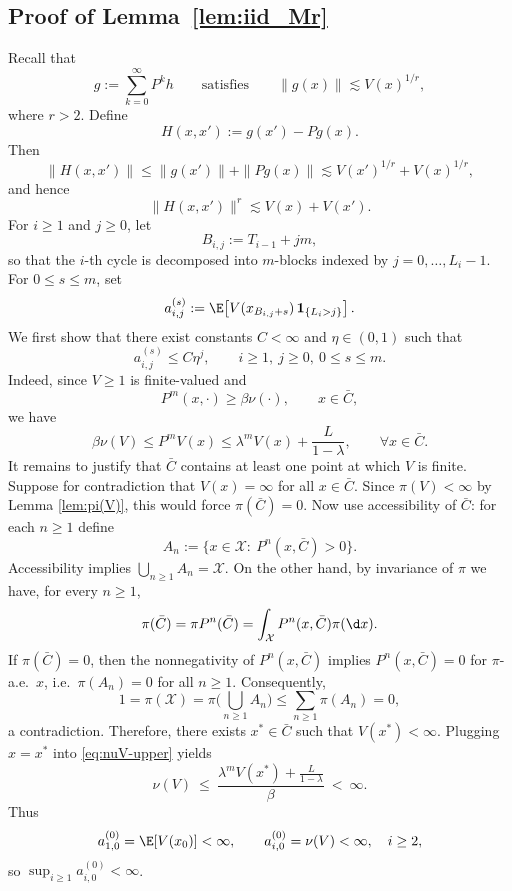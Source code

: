 \documentclass[mnsc,nonblindrev]{informs3}
\begin{document}
\subsection{Proof of Lemma~\ref{lem:iid_Mr}}\label{sec:iid_Mr}
Recall that 
\[
g:=\sum_{k=0}^\infty P^k h
\qquad\text{satisfies}\qquad
\|g(x)\|\lesssim V(x)^{1/r},
\]
where \(r>2\). Define
\[
H(x,x'):=g(x')-Pg(x).
\]
Then
\begin{equation}\label{eq:H-bound}
\|H(x,x')\|
\le \|g(x')\|+\|Pg(x)\|
\lesssim V(x')^{1/r}+V(x)^{1/r},
\end{equation}
and hence
\begin{equation}\label{eq:H-r-bound}
\|H(x,x')\|^r \lesssim V(x)+V(x').
\end{equation}
For \(i\ge1\) and \(j\ge0\), let
\[
B_{i,j}:=T_{i-1}+jm,
\]
so that the \(i\)-th cycle is decomposed into \(m\)-blocks indexed by
\(j=0,\dots,L_i-1\). For \(0\le s\le m\), set
\[
a_{i,j}^{(s)}
:=
\E\!\left[V(x_{B_{i,j}+s})\,\mathbf 1_{\{L_i>j\}}\right].
\]
We first show that there exist constants \(C<\infty\) and \(\eta\in(0,1)\) such
that
\begin{equation}\label{eq:cycle-V-bound}
a_{i,j}^{(s)}\le C\eta^j,
\qquad
i\ge1,\ j\ge0,\ 0\le s\le m.
\end{equation}
Indeed, since \(V\ge1\) is finite-valued and
\[
P^m(x,\cdot)\ge \beta \nu(\cdot),\qquad x\in \bar C,
\]
we have
\begin{equation}\label{eq:nuV-upper}
\beta \nu(V)\le P^mV(x)\le \lambda^mV(x)+\frac{L}{1-\lambda},
\qquad \forall x\in \bar C.
\end{equation}
It remains to justify that $\bar C$ contains at least one point at which $V$ is finite.
Suppose for contradiction that $V(x)=\infty$ for all $x\in\bar C$.
Since $\pi(V)<\infty$ by Lemma \ref{lem:pi(V)}, this would force $\pi(\bar C)=0$.
Now use accessibility of $\bar C$: for each $n\ge1$ define
\[
  A_n:=\{x\in\mathcal X:\ P^n(x,\bar C)>0\}.
\]
Accessibility implies $\bigcup_{n\ge1}A_n=\mathcal X$.
On the other hand, by invariance of $\pi$ we have, for every $n\ge1$,
\[
  \pi(\bar C)=\pi P^n(\bar C)
  =\int_{\mathcal X} P^n(x,\bar C)\pi(\d x).
\]
If $\pi(\bar C)=0$, then the nonnegativity of $P^n(x,\bar C)$ implies
$P^n(x,\bar C)=0$ for $\pi$-a.e.\ $x$, i.e.\ $\pi(A_n)=0$ for all $n\ge1$.
Consequently,
\[
  1=\pi(\mathcal X)
  =\pi\Big(\bigcup_{n\ge1}A_n\Big)
  \le \sum_{n\ge1}\pi(A_n)
  =0,
\]
a contradiction. Therefore, there exists $x^*\in\bar C$ such that $V(x^*)<\infty$.
Plugging $x=x^*$ into \eqref{eq:nuV-upper} yields
\[
  \nu(V)
  \ \le\ \frac{\lambda^m V(x^*) + \frac{L}{1-\lambda}}{\beta}
  \ <\ \infty.
\]
Thus
\[
a_{1,0}^{(0)}=\E[V(x_0)]<\infty,
\qquad
a_{i,0}^{(0)}=\nu(V)<\infty,\quad i\ge2,
\]
so \(\sup_{i\ge1}a_{i,0}^{(0)}<\infty\).
\end{document}
